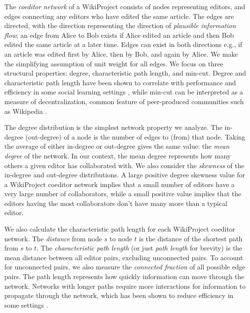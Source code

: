 The {\em coeditor network} of a WikiProject consists of nodes representing editors,
and edges connecting any editors who have edited the same article.
The edges are directed, with the direction representing the direction of
{\em plausible information flow};
an edge from Alice to Bob exists if Alice edited an article and then Bob edited the same article at
a later time.
Edges can exist in both directions e.g.,
if an article was edited first by Alice, then by Bob, and again by Alice.
We make the simplifying assumption of unit weight for all edges.
We focus on three structural properties:
degree, characteristic path length, and min-cut.
Degree and characteristic path length have been shown to correlate with
performance and efficiency in some social learning settings
\cite{golub_naive_2010,mason_propagation_2008,grim_scientific_2013},
while min-cut can be interpreted as a measure of decentralization,
common feature of peer-produced communities such as Wikipedia
\cite{benkler_wealth_2006}.

The degree distribution is the simplest network property we analyze.
The in-degree (out-degree) of a node is the number of edges to (from) that node.
Taking the average of either in-degree or out-degree gives the same value:
the {\em mean degree} of the network.
In our context, the mean degree represents how many others a given editor has collaborated with.
We also consider the {\em skewness} of the in-degree and out-degree distributions.
A large positive degree skewness value for a WikiProject coeditor network
implies that a small number of editors have a very large number of collaborators,
while a small positive value implies that the editors having the most collaborators
don't have many more than a typical editor.

We also calculate the characteristic path length for each WikiProject coeditor network.
The {\em distance} from node $s$ to node $t$ is the distance of the shortest path
from $s$ to $t$.
The {\em characteristic path length} (or just {\em path length} for brevity)
is the mean distance between all editor pairs,
excluding unconnected pairs.
To account for unconnected pairs, we also measure the {\em connected fraction}
of all possible edge pairs.
The path length represents how quickly information can move through the network.
Networks with longer paths require more interactions for information to propagate through
the network,
which has been shown to reduce efficiency in some settings
\cite{mason_propagation_2008,barkoczi_social_2016}.

